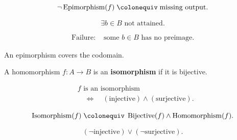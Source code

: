 \begin{remark*}
\[
\neg \operatorname{Epimorphism}(f)
\;\colonequiv\;
\text{missing output}.
\]
\end{remark*}

\begin{remark*}
\[
\exists b \in B \text{ not attained}.
\]
\end{remark*}

\begin{remark*}
\[
\begin{aligned}
\text{Failure: } 
&\text{some } b \in B \text{ has no preimage}.
\end{aligned}
\]
\end{remark*}

\begin{remark*}[Interpretation]
An epimorphism covers the codomain.
\end{remark*}


\begin{tcolorbox}[title={Definition --- Isomorphism}]
\begin{definition}[Isomorphism]
\label{def:isomorphism}
A homomorphism $f : A \to B$ is an \textbf{isomorphism} if it is bijective.
\end{definition}
\end{tcolorbox}

\begin{remark*}
\[
\begin{aligned}
&f \text{ is an isomorphism} \\
&\quad\Longleftrightarrow\quad
(\text{injective}) \land (\text{surjective}).
\end{aligned}
\]
\end{remark*}

\begin{remark*}
\[
\operatorname{Isomorphism}(f)
\;\colonequiv\;
\operatorname{Bijective}(f)
\land
\operatorname{Homomorphism}(f).
\]
\end{remark*}

\begin{remark*}
\[
(\neg \text{injective}) \lor (\neg \text{surjective}).
\]
\end{remark*}

